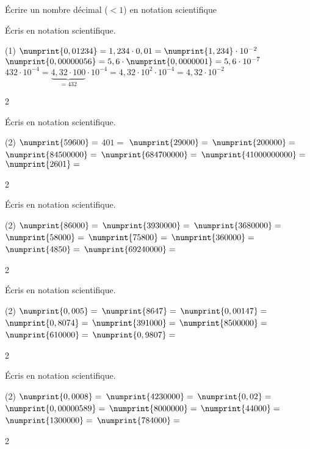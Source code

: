\documentclass[a4paper,11pt]{report}
\begin{document}
\begin{resolu}{Écrire un nombre décimal ($<1$) en notation scientifique}{
    Écris en notation scientifique. 
    \begin{tasks}(1)
        \task $\numprint{0,01234} = 1,234\cdot0,01=\numprint{1,234}\cdot10^{-2}$
        \task $\numprint{0,00000056} = 5,6\cdot\numprint{0,0000001}=5,6\cdot10^{-7}$
        \task $432\cdot10^{-4} =\underbrace{4,32\cdot100}_{=432}\cdot10^{-4}=4,32\cdot10^2\cdot10^{-4}=4,32\cdot10^{-2}$
    \end{tasks}
}{2}
\end{resolu}

\begin{exop}{
    Écris en notation scientifique. 
    \begin{tasks}(2)
        \task $\numprint{59600} =$
        \task $401 =$
        \task $\numprint{29000} =$
        \task $\numprint{200000} =$
        \task $\numprint{84500000} =$
        \task $\numprint{684700000} =$
        \task $\numprint{41000000000} =$
        \task $\numprint{2601} =$
    \end{tasks}
}{2}    
\end{exop}

\begin{exop}{
    Écris en notation scientifique. 
    \begin{tasks}(2)
        \task $\numprint{86000} =$
        \task $\numprint{3930000} =$
        \task $\numprint{3680000} =$
        \task $\numprint{58000} =$
        \task $\numprint{75800} =$
        \task $\numprint{360000} =$
        \task $\numprint{4850} =$
        \task $\numprint{69240000}=$
    \end{tasks}
}{2}    
\end{exop}

\begin{exop}{
    Écris en notation scientifique. 

    \begin{tasks}(2)
        \task $\numprint{0,005} =$
        \task $\numprint{8647} =$
        \task $\numprint{0,00147} =$
        \task $\numprint{0,8074} =$
        \task $\numprint{391000} =$
        \task $\numprint{8500000} =$
        \task $\numprint{610000} =$
        \task $\numprint{0,9807} =$
    \end{tasks}
}{2}    
\end{exop}


\begin{exop}{
    Écris en notation scientifique. 

    \begin{tasks}(2)
        \task $\numprint{0,0008} =$
        \task $\numprint{4230000} =$
        \task $\numprint{0,02} =$
        \task $\numprint{0,00000589} =$
        \task $\numprint{8000000} =$
        \task $\numprint{44000} =$
        \task $\numprint{1300000} =$
        \task $\numprint{784000} =$
    \end{tasks}
}{2}    
\end{exop}
\end{document}
